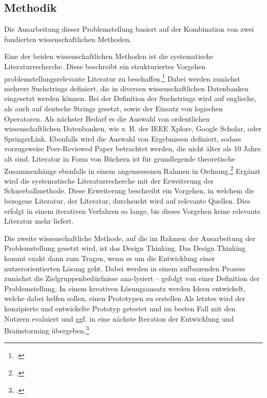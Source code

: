 \subsection{Methodik}
Die Ausarbeitung dieser Problemstellung basiert auf der Kombination von zwei fundierten wissenschaftlichen Methoden.

Eine der beiden wissenschaftlichen Methoden ist die systematische Literaturrecherche.
Diese beschreibt ein strukturiertes Vorgehen problemstellungsrelevante Literatur zu beschaffen.\footcite{brocke2015standing}
Dabei werden zunächst mehrere Suchstrings definiert, die in diversen wissenschaftlichen Datenbanken eingesetzt werden können.
Bei der Definition der Suchstrings wird auf englische, als auch auf deutsche Strings gesetzt, sowie der Einsatz von logischen Operatoren.
Als nächster Bedarf es die Auswahl von ordentlichen wissenschaftlichen Datenbanken, wie z. B. der IEEE Xplore, Google Scholar, oder SpringerLink.
Ebenfalls wird die Auswahl von Ergebnissen definiert, sodass vorzugsweise Peer-Reviewed Paper betrachtet werden, die nicht älter als 10 Jahre alt sind.
Literatur in Form von Büchern ist für grundlegende theoretische Zusammenhänge ebenfalls in einem angemessenen Rahmen in Ordnung.\footcite{xiao2019guidance}
Ergänzt wird die systematische Literaturrecherche mit der Erweiterung der Schneeballmethode.
Diese Erweiterung beschreibt ein Vorgehen, in welchem die bezogene Literatur, der Literatur, durchsucht wird auf relevante Quellen.
Dies erfolgt in einem iterativen Verfahren so lange, bis dieses Vorgehen keine relevante Literatur mehr liefert.

Die zweite wissenschaftliche Methode, auf die im Rahmen der Ausarbeitung der Problemstellung gesetzt wird, ist das Design Thinking.
Das Design Thinking kommt exakt dann zum Tragen, wenn es um die Entwicklung einer nutzerorientierten Lösung geht.
Dabei werden in einem aufbauenden Prozess zunächst die Zielgruppenbedürfnisse ana-lysiert – gefolgt von einer Definition der Problemstellung.
In einem kreativen Lösungsansatz werden Ideen entwickelt, welche dabei helfen sollen, einen Prototypen zu erstellen Als letztes wird der konzipierte und entwickelte Prototyp getestet und im besten Fall mit den Nutzern evaluiert und ggf. in eine nächste Iteration der Entwicklung und Brainstorming übergeben.\footcite{heller2020design}